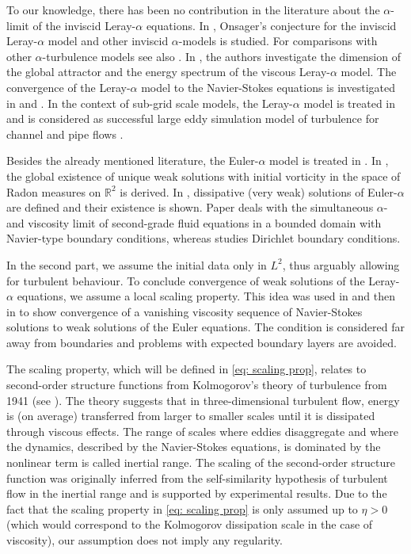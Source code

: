 \documentclass{amsart}
\begin{document}
To our knowledge, there has been no contribution in the literature about the $\alpha$-limit of the inviscid Leray-$\alpha$ equations. In \cite{Boutros.2023}, Onsager’s conjecture for the inviscid Leray-$\alpha$ model and other inviscid $\alpha$-models is studied. For comparisons with other $\alpha$-turbulence models see also \cite{Guermond.2003, Holm.1999}. In \cite{Cheskidov.2005}, the authors investigate the dimension of the global attractor and the energy spectrum of the viscous Leray-$\alpha$ model. The convergence of the Leray-$\alpha$ model to the Navier-Stokes equations is investigated in \cite{Cao.2009} and \cite{V.Chepyzhov.2007}.
In the context of sub-grid scale models, the Leray-$\alpha$ model is treated in \cite{Geurts.2006, Geurts.2008, PietarilaGraham.2008} and is considered as successful large eddy simulation model of turbulence for channel and pipe flows \cite{Cheskidov.2005}. 

Besides the already mentioned literature, the Euler-$\alpha$ model is treated in \cite{Busuioc.1999, Busuioc.2003, MARSDEN.2003,Marsden.2000,Shkoller.2000}. 
In \cite{Oliver.2001}, the global existence of unique weak solutions with initial vorticity in the space of Radon measures on $\mathbb{R}^2$ is derived. In \cite{Vorotnikov.2012}, dissipative (very weak) solutions of Euler-$\alpha$ are defined and their existence is shown.  
Paper \cite{Busuioc.2012} deals with the simultaneous $\alpha$- and viscosity limit of second-grade fluid equations in a bounded domain with Navier-type boundary conditions, whereas \cite{MR3345360} studies Dirichlet boundary conditions. 


In the second part, we assume the initial data only in $L^2$, thus arguably allowing for turbulent behaviour. To conclude convergence of weak solutions of the Leray-$\alpha$ equations, we assume a local scaling property. This idea was used in \cite{Constantin.2018} and then in \cite{Drivas} to show convergence of a vanishing viscosity sequence of Navier-Stokes solutions to weak solutions of the Euler equations. The condition is considered far away from boundaries and problems with expected boundary layers are avoided.

The scaling property, which will be defined in \eqref{eq: scaling prop}, relates to second-order structure functions from Kolmogorov's theory of turbulence from 1941 (see \cite{Frisch.1995}). The theory suggests that in three-dimensional turbulent flow, energy is (on average) transferred from larger to smaller scales until it is dissipated through viscous effects. The range of scales where eddies disaggregate and where the dynamics, described by the Navier-Stokes equations, is dominated by the nonlinear term is called inertial range. The scaling of the second-order structure function was originally inferred from the self-similarity hypothesis of turbulent flow in the inertial range and is supported by experimental results. Due to the fact that the scaling property in \eqref{eq: scaling prop} is only assumed up to $\eta>0$ (which would correspond to the Kolmogorov dissipation scale in the case of viscosity), our assumption does not imply any regularity. 
\end{document}
